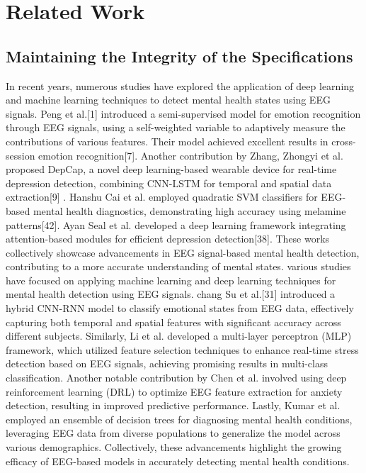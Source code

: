 \documentclass[conference]{IEEEtran}
\begin{document}
\section{Related Work}

\subsection{Maintaining the Integrity of the Specifications}

In recent years, numerous studies have explored the application of deep learning and machine learning techniques to detect mental health states using EEG signals. Peng et al.[1] introduced a semi-supervised model for emotion recognition through EEG signals, using a self-weighted variable to adaptively measure the contributions of various features. Their model achieved excellent results in cross-session emotion recognition[7]. Another contribution by Zhang, Zhongyi et al. proposed DepCap, a novel deep learning-based wearable device for real-time depression detection, combining CNN-LSTM for temporal and spatial data extraction[9] . Hanshu Cai et al. employed quadratic SVM classifiers for EEG-based mental health diagnostics, demonstrating high accuracy using melamine patterns[42]. Ayan Seal et al. developed a deep learning framework integrating attention-based modules for efficient depression detection[38]. These works collectively showcase advancements in EEG signal-based mental health detection, contributing to a more accurate understanding of mental states. various studies have focused on applying machine learning and deep learning techniques for mental health detection using EEG signals. chang Su et al.[31] introduced a hybrid CNN-RNN model to classify emotional states from EEG data, effectively capturing both temporal and spatial features with significant accuracy across different subjects. Similarly, Li et al. developed a multi-layer perceptron (MLP) framework, which utilized feature selection techniques to enhance real-time stress detection based on EEG signals, achieving promising results in multi-class classification. Another notable contribution by Chen et al. involved using deep reinforcement learning (DRL) to optimize EEG feature extraction for anxiety detection, resulting in improved predictive performance. Lastly, Kumar et al. employed an ensemble of decision trees for diagnosing mental health conditions, leveraging EEG data from diverse populations to generalize the model across various demographics. Collectively, these advancements highlight the growing efficacy of EEG-based models in accurately detecting mental health conditions.
\end{document}
